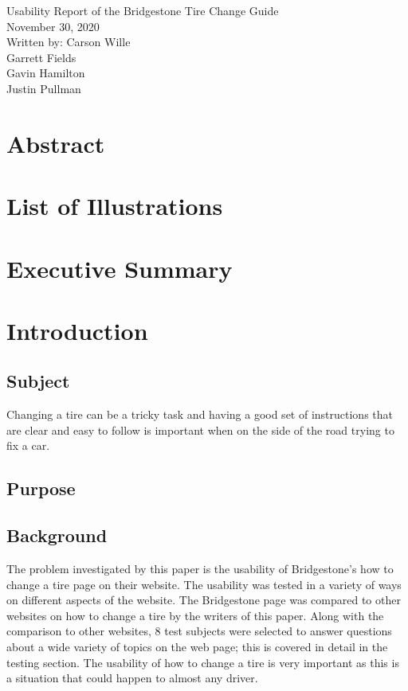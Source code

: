 \documentclass[12pt,A4paper]{article}
\begin{document}
	\thispagestyle{empty}
	\begin{center}
		\Huge
		Usability Report of the Bridgestone Tire Change Guide \\
		\vspace{0.25 in}
		\Large
		 November 30, 2020 \\
		 \vspace{0.25 in}
		Written by: Carson Wille \\ \hspace{1.25 in} Garrett Fields \\ \hspace{1.4 in} Gavin Hamilton \\ \hspace{1.33 in} Justin Pullman
		
	\end{center}
	\clearpage
	\setcounter{page}{2}
	\section{Abstract}

	\tableofcontents
	\clearpage

	\section{List of Illustrations}

	\section{Executive Summary}

	\section{Introduction}
	
		\subsection{Subject}
		Changing a tire can be a tricky task and having a good set of instructions that are clear and easy to follow is important when on the side of the road trying to fix a car.

		\subsection{Purpose}

		\subsection{Background}
		The problem investigated by this paper is the usability of Bridgestone’s how to change a tire page on their website. The usability was tested in a variety of ways on different aspects of the website. The Bridgestone page was compared to other websites on how to change a tire by the writers of this paper. Along with the comparison to other websites, 8 test subjects were selected to answer questions about a wide variety of topics on the web page; this is covered in detail in the testing section. The usability of how to change a tire is very important as this is a situation that could happen to almost any driver.
\end{document}
